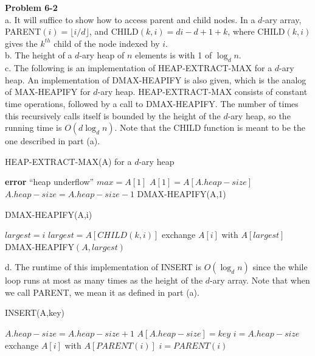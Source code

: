 \documentclass{article}
\begin{document}
\noindent\textbf{Problem 6-2}\\

a. It will suffice to show how to access parent and child nodes.  In a $d$-ary array, PARENT$(i) = \lfloor i/d \rfloor$, and CHILD$(k,i) = di - d + 1 + k$, where CHILD$(k,i)$ gives the $k^{th}$ child of the node indexed by $i$. \\

b. The height of a $d$-ary heap of $n$ elements is with 1 of $\log_d n$. \\

c.  The following is an implementation of HEAP-EXTRACT-MAX for a $d$-ary heap.  An implementation of DMAX-HEAPIFY is also given, which is the analog of MAX-HEAPIFY for $d$-ary heap.  HEAP-EXTRACT-MAX consists of constant time operations, followed by a call to DMAX-HEAPIFY.  The number of times this recursively calls itself is bounded by the height of the $d$-ary heap, so the running time is $O(d\log_d n)$.  Note that the CHILD function is meant to be the one described in part (a).\\

\begin{algorithm}
\caption{HEAP-EXTRACT-MAX(A) for a $d$-ary heap}
\begin{algorithmic}[1]
	\State \textbf{error} ``heap underflow''
\EndIf
\State $max = A[1]$
\State $A[1] = A[A.heap-size]$
\State $A.heap-size = A.heap-size - 1$
\State DMAX-HEAPIFY(A,1)
\end{algorithmic}
\end{algorithm}

\begin{algorithm}
\caption{DMAX-HEAPIFY(A,i)}
\begin{algorithmic}[1]
\State $largest = i$
			\State $largest = A[CHILD(k,i)]$
		\EndIf
	\EndIf
\EndFor
{}
	\State exchange $A[i]$ with $A[largest]$
	\State DMAX-HEAPIFY$(A,largest)$
\EndIf
\end{algorithmic}
\end{algorithm}

d.  The runtime of this implementation of INSERT is $O(\log_d n)$ since the while loop runs at most as many times as the height of the $d$-ary array.  Note that when we call PARENT, we mean it as defined in part (a).\\

\begin{algorithm}
\caption{INSERT(A,key)}
\begin{algorithmic}[1]
\State $A.heap-size = A.heap-size + 1$
\State $A[A.heap-size] = key$
\State $i = A.heap-size$
\While{$i > 1$ and $A[PARENT(i) < A[i]$}
	\State exchange $A[i]$ with $A[PARENT(i)]$
	\State $i = PARENT(i)$
\EndWhile
\end{algorithmic}
\end{algorithm}
\end{document}
